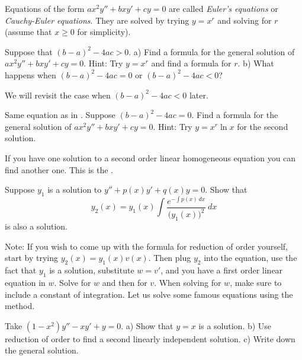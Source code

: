 Equations of the form $a x^2 y'' + b x y' + c y = 0$ are called
\emph{Euler's equations} or
\emph{Cauchy-Euler equations}.
They are solved by trying
$y=x^r$ and solving for $r$ (assume that $x \geq 0$ for simplicity).

\begin{exercise} \label{sol:eulerex}
Suppose that ${(b-a)}^2-4ac > 0$.  a) Find a formula for the general solution
of $a x^2 y'' + b x y' + c y = 0$.  Hint: Try $y=x^r$ and find a formula for
$r$.
b) What happens when ${(b-a)}^2-4ac = 0$ or ${(b-a)}^2-4ac < 0$?
\end{exercise}

We will revisit the case when ${(b-a)}^2-4ac < 0$ later.

\begin{exercise} \label{sol:eulerexln}
Same equation as in .
Suppose ${(b-a)}^2-4ac = 0$.  Find a formula for the general solution
of $a x^2 y'' + b x y' + c y = 0$.  Hint: Try $y=x^r \ln x$ for the second
solution.
\end{exercise}

If you have one solution to a second order linear homogeneous
equation you can find another one.  This is the \emph{}.

\begin{exercise} \label{exercise:reductionoforder}
Suppose $y_1$ is a solution to $y'' + p(x) y' + q(x) y = 0$.
Show that
\begin{equation*}
y_2(x) = y_1(x) \int \frac{e^{-\int p(x)\,dx}}{{\bigl(y_1(x)\bigr)}^2} ~dx
\end{equation*}
is also a solution.
\end{exercise}

Note: If you wish to come up with the formula for reduction of order
yourself,
start by trying $y_2(x) = y_1(x) v(x)$.  Then plug $y_2$ into the
equation, use the fact that $y_1$ is a solution, substitute
$w = v'$, and you have a first order linear equation in $w$.  Solve for
$w$ and then for $v$.  When solving for $w$, make sure to include a constant
of integration.
Let us solve some famous equations using the method.

\begin{exercise}
Take 
$(1-x^2)y''-xy' + y = 0$.  a) Show that $y=x$ is a solution.
b) Use reduction of order to find a second linearly independent solution.
c) Write down the general solution.
\end{exercise}

